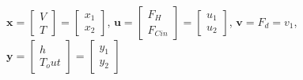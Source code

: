 \newline \(\textbf{x}=\begin{bmatrix}
V\\
T 
\end{bmatrix}=\begin{bmatrix}
x_1\\
x_2
\end{bmatrix}\), \(\textbf{u}=\begin{bmatrix}
F_H\\
F_{Cin} 
\end{bmatrix}=\begin{bmatrix}
u_1\\
u_2
\end{bmatrix}\), \(\textbf{v}=F_d=v_1\), \(\textbf{y}=\begin{bmatrix}
h\\
T_out 
\end{bmatrix}=\begin{bmatrix}
y_1\\
y_2
\end{bmatrix}\)





